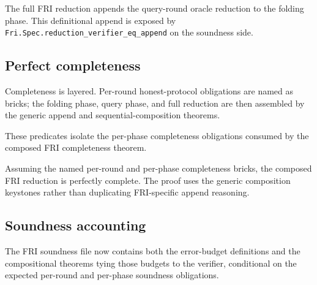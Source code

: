 \begin{definition}\label{def:fri_reduction}
    The full FRI reduction appends the query-round oracle reduction to the folding phase.  This
    definitional append is exposed by \texttt{Fri.Spec.reduction\_verifier\_eq\_append} on the
    soundness side.
\end{definition}

\subsection{Perfect completeness}\label{sec:fri_completeness}

Completeness is layered.  Per-round honest-protocol obligations are named as bricks; the
folding phase, query phase, and full reduction are then assembled by the generic append and
sequential-composition theorems.

\begin{definition}\label{def:fri_completeness_residual}
    These predicates isolate the per-phase completeness obligations consumed by the composed
    FRI completeness theorem.
\end{definition}

\begin{theorem}\label{thm:fri_completeness}
    Assuming the named per-round and per-phase completeness bricks, the composed FRI reduction is
    perfectly complete.  The proof uses the generic composition keystones rather than duplicating
    FRI-specific append reasoning.
\end{theorem}

\subsection{Soundness accounting}\label{sec:fri_soundness}

The FRI soundness file now contains both the error-budget definitions and the compositional
theorems tying those budgets to the verifier, conditional on the expected per-round and
per-phase soundness obligations.

